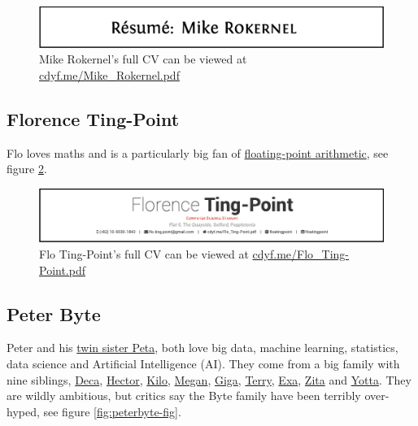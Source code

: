 \documentclass[
]{book}
\begin{document}
\begin{figure}

{\centering \includegraphics[width=1\linewidth]{images/mike_rokernel_usa} 

}

\caption{Mike Rokernel's full CV can be viewed at \href{https://www.cdyf.me/Mike_Rokernel.pdf}{cdyf.me/Mike\_Rokernel.pdf}}\label{fig:mikrokernel-fig}
\end{figure}



\hypertarget{flo-ting-point}{%
\subsection{Florence Ting-Point}\label{flo-ting-point}}

Flo loves maths and is a particularly big fan of \href{https://en.wikipedia.org/wiki/Floating-point_arithmetic}{floating-point arithmetic}, see figure \ref{fig:floatingpoint-fig}.

\begin{figure}

{\centering \includegraphics[width=1\linewidth]{images/flo_ting_point} 

}

\caption{Flo Ting-Point's full CV can be viewed at \href{https://www.cdyf.me/Flo_Ting-Point.pdf}{cdyf.me/Flo\_Ting-Point.pdf}}\label{fig:floatingpoint-fig}
\end{figure}



\hypertarget{peter-byte}{%
\subsection{Peter Byte}\label{peter-byte}}

Peter and his \href{https://en.wikipedia.org/wiki/Peta_(given_name)}{twin sister Peta}, both love big data, machine learning, statistics, data science and Artificial Intelligence (AI). They come from a big family with nine siblings, \href{https://en.wikipedia.org/wiki/Deca-}{Deca}, \href{https://en.wikipedia.org/wiki/Hecto-}{Hector}, \href{https://en.wikipedia.org/wiki/Kilo-}{Kilo}, \href{https://en.wikipedia.org/wiki/Mega-}{Megan}, \href{https://en.wikipedia.org/wiki/Giga-}{Giga}, \href{https://en.wikipedia.org/wiki/Tera-}{Terry}, \href{https://en.wikipedia.org/wiki/Exa-}{Exa}, \href{https://en.wikipedia.org/wiki/Zetta-}{Zita} and \href{https://en.wikipedia.org/wiki/Yotta-}{Yotta}. They are wildly ambitious, but critics say the Byte family have been terribly over-hyped, see figure \ref{fig:peterbyte-fig}.
\end{document}
